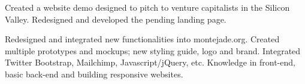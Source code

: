 \documentclass[]{deedy-resume-openfont}
\begin{document}
\begin{minipage}[t]{0.64\textwidth}
\vspace{\topsep} %
Created a website demo designed to pitch to venture capitalists in the Silicon Valley. Redesigned and developed the pending landing page.
\sectionsep

\vspace{\topsep} %
Redesigned and integrated new functionalities into montejade.org. Created multiple prototypes and mockups; new styling guide, logo and brand. Integrated Twitter Bootstrap, Mailchimp, Javascript/jQuery, etc. Knowledge in front-end, basic back-end and building responsive websites.
\sectionsep

\end{minipage} 
\end{document}
